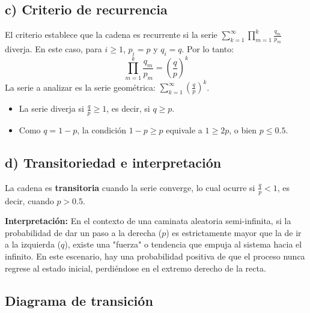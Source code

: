 \documentclass[letterpaper, 12pt]{article}
\begin{document}
    \subsection*{c) Criterio de recurrencia}
    El criterio establece que la cadena es recurrente si la serie $\sum_{k=1}^{\infty} \prod_{m=1}^{k} \frac{q_m}{p_m}$ diverja. 
    En este caso, para $i \geq 1$, $p_i = p$ y $q_i = q$. Por lo tanto:
    \[ \prod_{m=1}^{k} \frac{q_m}{p_m} = \left(\frac{q}{p}\right)^k \]
    La serie a analizar es la serie geométrica: $\sum_{k=1}^{\infty} \left(\frac{q}{p}\right)^k$.
    \begin{itemize}
        \item La serie diverja si $\frac{q}{p} \geq 1$, es decir, si $q \geq p$.
        \item Como $q = 1-p$, la condición $1-p \geq p$ equivale a $1 \geq 2p$, o bien \textbf{$p \leq 0.5$}.
    \end{itemize}

    \subsection*{d) Transitoriedad e interpretación}
    La cadena es \textbf{transitoria} cuando la serie converge, lo cual ocurre si $\frac{q}{p} < 1$, es decir, cuando \textbf{$p > 0.5$}.

    \textbf{Interpretación:} En el contexto de una caminata aleatoria semi-infinita, si la probabilidad de dar un paso a la derecha ($p$) es estrictamente mayor que la de ir a la izquierda ($q$), existe una "fuerza" o tendencia que empuja al sistema hacia el infinito. En este escenario, hay una probabilidad positiva de que el proceso nunca regrese al estado inicial, perdiéndose en el extremo derecho de la recta.

    \subsection*{Diagrama de transición}
    \begin{center}
    \end{center}
\end{document}

